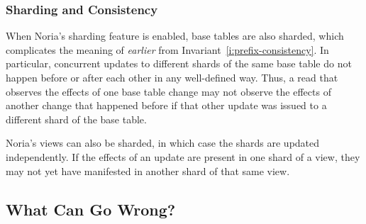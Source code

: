 %
%
%

\subsubsection*{Sharding and Consistency}

When Noria's sharding feature is enabled, base tables are also sharded, which
complicates the meaning of \emph{earlier} from
Invariant~\ref{i:prefix-consistency}. In particular, concurrent updates to
different shards of the same base table do not happen before or after each other
in any well-defined way. Thus, a read that observes the effects of one base
table change may not observe the effects of another change that happened before
if that other update was issued to a different shard of the base table.

Noria's views can also be sharded, in which case the shards are updated
independently. If the effects of an update are present in one shard of a view,
they may not yet have manifested in another shard of that same view.

\subsection{What Can Go Wrong?}


